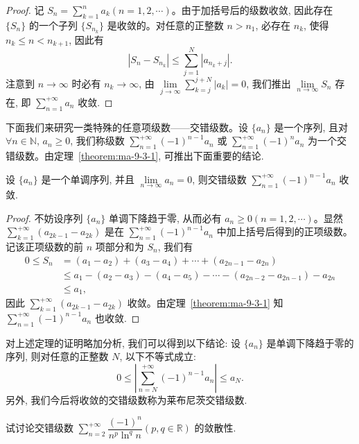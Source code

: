 \begin{proof}
记 $S_n=\sum\limits_{k=1}^n a_k(n=1,2,\cdots)$。由于加括号后的级数收敛, 因此存在 $\{S_n\}$ 的一个子列 $\{S_{n_k}\}$ 是收敛的。对任意的正整数 $n>n_1$, 必存在 $n_k$, 使得 $n_k\leq n<n_{k+1}$, 因此有
\[
  |S_n-S_{n_k}|\leq\sum_{j=1}^N|a_{n_k+j}|.
\]
注意到 $n\to\infty$ 时必有 $n_k\to\infty$, 由 $\lim\limits_{j\to\infty}\sum\limits_{k=j}^{j+N}|a_k|=0$, 我们推出 $\lim\limits_{n\to\infty}S_n$ 存在, 即 $\sum\limits_{n=1}^{+\infty}a_n$ 收敛.
\end{proof}


下面我们来研究一类特殊的任意项级数——交错级数。设 $\{a_n\}$ 是一个序列, 且对 $\forall n\in\mathbb{N}$, $a_n\geq0$, 我们称级数 $\sum\limits_{n=1}^{+\infty}(-1)^{n-1}a_n$ 或 $\sum\limits_{n=1}^{+\infty}(-1)^na_n$ 为一个交错级数。由定理~\ref{theorem:ma-9-3-1}, 可推出下面重要的结论.

\begin{corollary}[{莱布尼茨交错级数判别法}]\label{corollary:ma-9-source-55}
设 $\{a_n\}$ 是一个单调序列, 并且 $\lim\limits_{n\to\infty}a_n=0$, 则交错级数 $\sum\limits_{n=1}^{+\infty}(-1)^{n-1}a_n$ 收敛.
\end{corollary}


\begin{proof}
不妨设序列 $\{a_n\}$ 单调下降趋于零, 从而必有 $a_n\geq0(n=1,2,\cdots)$。显然 $\sum\limits_{k=1}^{+\infty}(a_{2k-1}-a_{2k})$ 是在 $\sum\limits_{n=1}^{+\infty}(-1)^{n-1}a_n$ 中加上括号后得到的正项级数。记该正项级数的前 $n$ 项部分和为 $S_n$, 我们有
\[
\begin{aligned}
  0\leq S_n
  &=(a_1-a_2)+(a_3-a_4)+\cdots+(a_{2n-1}-a_{2n})\\
  &\leq a_1-(a_2-a_3)-(a_4-a_5)-\cdots-(a_{2n-2}-a_{2n-1})-a_{2n}\\
  &\leq a_1,
\end{aligned}
\]
因此 $\sum\limits_{k=1}^{+\infty}(a_{2k-1}-a_{2k})$ 收敛。由定理~\ref{theorem:ma-9-3-1} 知 $\sum\limits_{n=1}^{+\infty}(-1)^{n-1}a_n$ 也收敛.
\end{proof}


\begin{remark}\label{remark:ma-9-source-57}
对上述定理的证明略加分析, 我们可以得到以下结论: 设 $\{a_n\}$ 是单调下降趋于零的序列, 则对任意的正整数 $N$, 以下不等式成立:
\[
  0\leq\left|\sum_{n=N}^{+\infty}(-1)^{n-1}a_n\right|\leq a_N.
\]
另外, 我们今后将收敛的交错级数称为莱布尼茨交错级数.
\end{remark}


\begin{example}\label{example:ma-9-3-1}
试讨论交错级数 $\sum\limits_{n=2}^{+\infty}\dfrac{(-1)^n}{n^p\ln^q n}(p,q\in\mathbb{R})$ 的敛散性.
\end{example}


